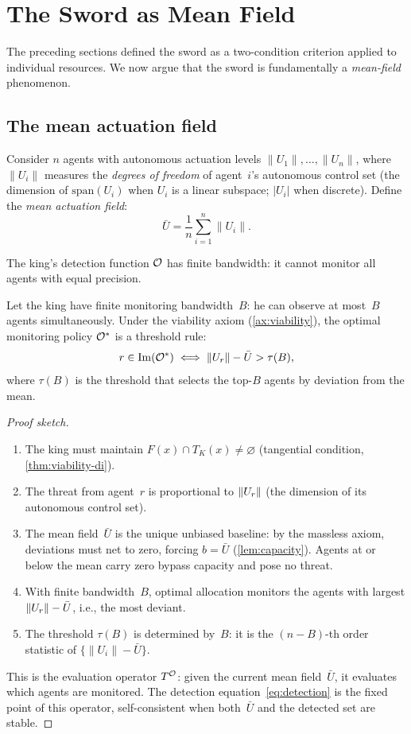 \chapter{The Sword as Mean Field}\label{sec:meanfield}

The preceding sections defined the sword as a two-condition criterion
applied to individual resources. We now argue that the sword is
fundamentally a \emph{mean-field} phenomenon.

\section{The mean actuation field}

Consider $n$ agents with autonomous actuation levels
$\|U_1\|, \ldots, \|U_n\|$, where $\|U_i\|$ measures the
\emph{degrees of freedom} of agent~$i$'s autonomous control set
(the dimension of $\mathrm{span}(U_i)$ when $U_i$ is a linear
subspace; $|U_i|$ when discrete).
Define the \emph{mean actuation field}:
\[
  \bar{U} = \frac{1}{n} \sum_{i=1}^{n} \|U_i\|.
\]

The king's detection function $\mathcal{O}$ has finite bandwidth: it cannot
monitor all agents with equal precision.

\begin{proposition}
\label{prop:detection-derivation}
Let the king have finite monitoring bandwidth~$B$: he can
observe at most~$B$ agents simultaneously.  Under the viability
axiom (\cref{ax:viability}), the optimal monitoring policy
$\mathcal{O}^*$ is a threshold rule:
\[
  r \in \mathrm{Im}(\mathcal{O}^*)
  \iff
  \|U_r\| - \bar{U} > \tau(B),
\]
where $\tau(B)$ is the threshold that selects the top-$B$
agents by deviation from the mean.
\end{proposition}

\begin{proof}[Proof sketch]
\leavevmode
\begin{enumerate}[label=(\roman*),nosep]
  \item The king must maintain $F(x) \cap T_K(x) \neq
  \varnothing$ (tangential condition,
  \cref{thm:viability-di}).
  \item The threat from agent~$r$ is proportional to
  $\|U_r\|$ (the dimension of its autonomous control set).
  \item The mean field~$\bar{U}$ is the unique unbiased
  baseline: by the massless axiom, deviations must net to
  zero, forcing $b = \bar{U}$ (\cref{lem:capacity}).
  Agents at or below the mean carry zero bypass capacity
  and pose no threat.
  \item With finite bandwidth~$B$, optimal allocation monitors
  the agents with largest $\|U_r\| - \bar{U}$, i.e., the
  most deviant.
  \item The threshold $\tau(B)$ is determined by~$B$: it is
  the $(n - B)$-th order statistic of
  $\{\|U_i\| - \bar{U}\}$.
\end{enumerate}
This is the evaluation operator $T^{\mathcal{O}}$: given the current
mean field~$\bar{U}$, it evaluates which agents are monitored.
The detection equation~\eqref{eq:detection} is the fixed point
of this operator, self-consistent when both~$\bar{U}$ and the
detected set are stable.
\end{proof}

